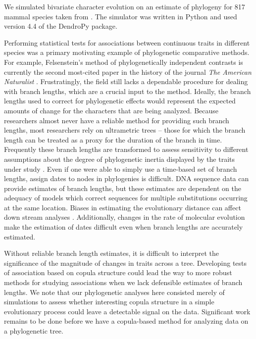 We simulated bivariate character evolution on an estimate of 
  phylogeny for 817 mammal species taken from \citep{GenoudIM2018}.
The simulator was written in Python and used version 4.4 of 
  the DendroPy \citep{DendroPy} package.


Performing statistical tests for associations between continuous traits in different species
    was a primary motivating example of phylogenetic comparative methods.
For example, Felsenstein's method of phylogenetically independent contrasts 
    \citep{Felsenstein1985} is currently the second most-cited paper in the history
    of the journal {\em The American Naturalist} \citep{HueyGT2019}.
Frustratingly, the field still lacks a dependable procedure for dealing with branch lengths, 
    which are a crucial input to the method.
Ideally, the branch lengths used to correct for phylogenetic effects would represent
    the expected amounts of change for the characters that are being analyzed.
Because researchers almost never have a reliable method for providing such branch lengths,
    most researchers rely on ultrametric trees -- those for which the branch
    length can be treated as a proxy for the duration of the branch in time.
Frequently these branch lengths are transformed to assess sensitivity to different 
    assumptions about the degree of phylogenetic inertia displayed by the traits
    under study \citep[See recent reviews, ][]{Ives2018,Harmon2018}.
Even if one were able to simply use a time-based set of branch lengths, assign
    dates to nodes in phylogenies is difficult.
DNA sequence data can provide estimates of branch lengths, but these estimates
    are dependent on the adequacy of models which correct sequences for multiple
    substitutions occurring at the same location.
Biases in estimating the evolutionary distance can affect down stream analyses \citep[See][]{Phillips2009}.
Additionally, changes
    in the rate of molecular evolution make the estimation of dates difficult \citep[See][]{HeathM2014} even when branch lengths are accurately estimated.

Without reliable branch length estimates, it is difficult to interpret the significance
    of the magnitude of changes in traits across a tree.
Developing tests of association based on copula structure could lead the way to more
    robust methods for studying associations when we lack defensible estimates of
    branch lengths.
We note that our phylogenetic analyses here consisted merely of simulations to assess
    whether interesting copula structure in a simple evolutionary process could 
    leave a detectable signal on the data.
Significant work remains to be done before we have a copula-based method for 
    analyzing data on a phylogenetic tree.

